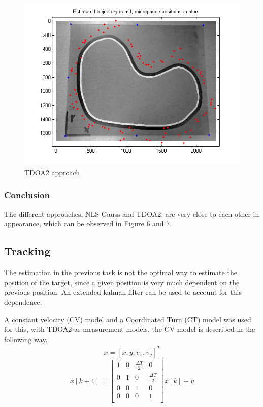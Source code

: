 \documentclass[11pt]{article}
\begin{document}
\begin{figure}
\begin{center}
  \includegraphics[width=\textwidth]{TDOA_all_around.png}
  \caption{TDOA2 approach.}
  \end{center}
\end{figure}


\subsubsection{Conclusion}
The different approaches, NLS Gauss and TDOA2, are very close to each other in appearance, which can be observed in Figure 6 and 7.

\subsection{Tracking}
The estimation in the previous task is not the optimal way to estimate the position of the target, since a given position is very much dependent on the previous position. An extended kalman filter can be used to account for this dependence. 

A constant velocity (CV) model and a Coordinated Turn (CT) model was used for this, with TDOA2 as measurement models, the CV model is described in the following way.
\begin{align*}
x = [x, y, v_x, v_y]^T
\end{align*}
\[
  \bar{x}[k+1] = 
  \begin{bmatrix}
    1 & 0 & \frac{\Delta T}{2} & 0 \\
    0 & 1 & 0 & \frac{\Delta T}{2} \\
    0 & 0 & 1 & 0 \\
    0 & 0 & 0 & 1 \\
  \end{bmatrix}
  \bar{x}[k] + \bar{v}
\]
\end{document}
